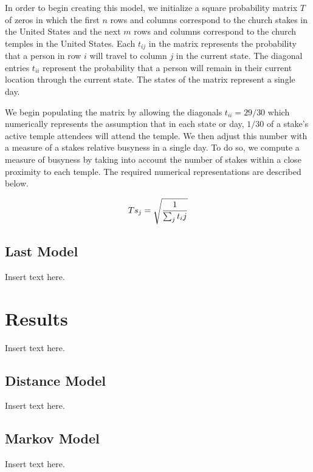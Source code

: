 \documentclass[twoside,twocolumn]{article}
\begin{document}
In order to begin creating this model, we initialize a square probability matrix $T$ of zeros in which the first $n$ rows and columns correspond to the church stakes in the United States and the next $m$ rows and columns correspond to the church temples in the United States. Each $t_{ij}$ in the matrix represents the probability that a person in row $i$ will travel to column $j$ in the current state. The diagonal entries $t_{ii}$ represent the probability that a person will remain in their current location through the current state. The states of the matrix represent a single day.

We begin populating the matrix by allowing the diagonals $t_{ii} = 29/30$ which numerically represents the assumption that in each state or day, $1/30$ of a stake's active temple attendees will attend the temple. We then adjust this number with a measure of a stakes relative busyness in a single day. To do so, we compute a measure of busyness by taking into account the number of stakes within a close proximity to each temple. The required numerical representations are described below.

\begin{equation}
\begin{aligned}
Ts_j = \sqrt{1\over{\sum_j{t_ij}}}
\end{aligned}
\end{equation}


\subsection{Last Model} %
Insert text here.

\section{Results}
\label{sec:res}
Insert text here.

\subsection{Distance Model}
Insert text here.

\subsection{Markov Model}
Insert text here.
\end{document}
